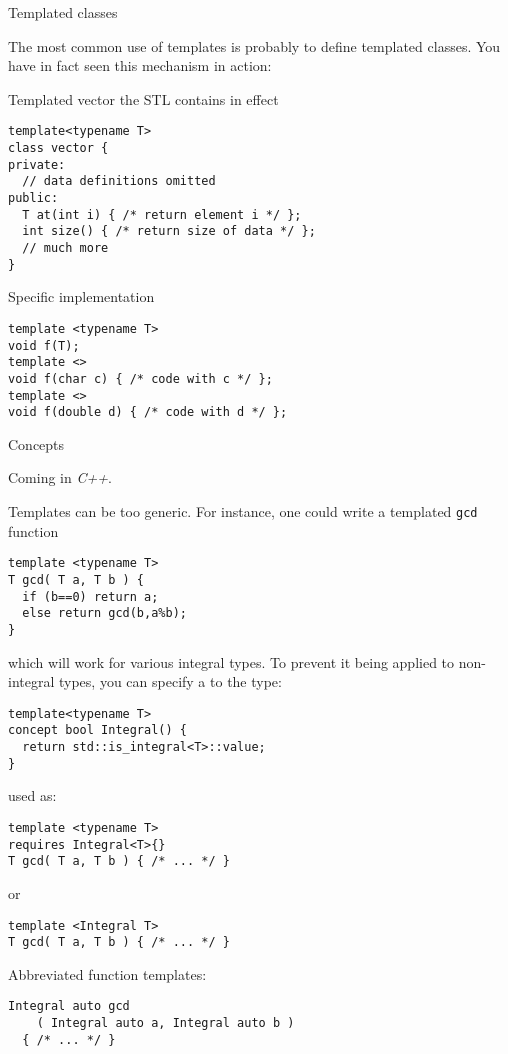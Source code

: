  {Templated classes}

The most common use of templates is probably to define templated
classes.
You have in fact seen this mechanism in action:
\begin{block}{Templated vector}
  \label{sl:template-vector}
  the \ac{STL} contains
  in effect
\begin{lstlisting}
template<typename T>
class vector {
private:
  // data definitions omitted
public:
  T at(int i) { /* return element i */ };
  int size() { /* return size of data */ };
  // much more
}
\end{lstlisting}
\end{block}

 {Specific implementation}

\begin{lstlisting}
template <typename T>
void f(T);
template <> 
void f(char c) { /* code with c */ };
template <>
void f(double d) { /* code with d */ };
\end{lstlisting}

 {Concepts}
\label{sec:cpp-concepts}

Coming in \emph{C++}.

Templates can be too generic. For instance, one could write a
templated \lstinline{gcd} function
\begin{lstlisting}
template <typename T>
T gcd( T a, T b ) {
  if (b==0) return a;
  else return gcd(b,a%b);
}
\end{lstlisting}
which will work for various integral types. To prevent it being
applied to non-integral types, you can specify a 
to the type:
\begin{lstlisting}
template<typename T>
concept bool Integral() {
  return std::is_integral<T>::value;
}
\end{lstlisting}
used as:
\begin{lstlisting}
template <typename T>
requires Integral<T>{}
T gcd( T a, T b ) { /* ... */ }
\end{lstlisting}
or
\begin{lstlisting}
template <Integral T>
T gcd( T a, T b ) { /* ... */ }
\end{lstlisting}
Abbreviated function templates:
\begin{lstlisting}
Integral auto gcd
    ( Integral auto a, Integral auto b )
  { /* ... */ }
\end{lstlisting}

\endinput


